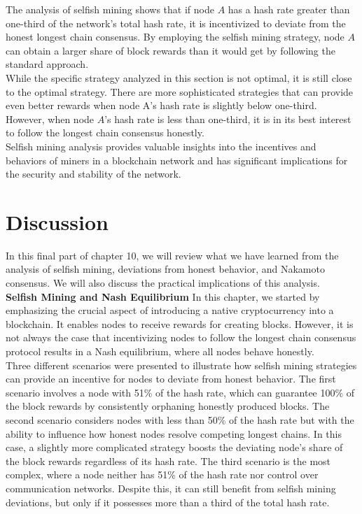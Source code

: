 The analysis of selfish mining shows that if node $A$ has a hash rate greater than one-third of the network's total hash rate, it is incentivized to deviate from the honest longest chain consensus. By employing the selfish mining strategy, node $A$ can obtain a larger share of block rewards than it would get by following the standard approach.\\

While the specific strategy analyzed in this section is not optimal, it is still close to the optimal strategy. There are more sophisticated strategies that can provide even better rewards when node A's hash rate is slightly below one-third. However, when node $A$'s hash rate is less than one-third, it is in its best interest to follow the longest chain consensus honestly.\\

Selfish mining analysis provides valuable insights into the incentives and behaviors of miners in a blockchain network and has significant implications for the security and stability of the network.

\section{Discussion}
In this final part of chapter 10, we will review what we have learned from the analysis of selfish mining, deviations from honest behavior, and Nakamoto consensus. We will also discuss the practical implications of this analysis.\\

\noindent
\textbf{Selfish Mining and Nash Equilibrium}
In this chapter, we started by emphasizing the crucial aspect of introducing a native cryptocurrency into a blockchain. It enables nodes to receive rewards for creating blocks. However, it is not always the case that incentivizing nodes to follow the longest chain consensus protocol results in a Nash equilibrium, where all nodes behave honestly.\\

Three different scenarios were presented to illustrate how selfish mining strategies can provide an incentive for nodes to deviate from honest behavior. The first scenario involves a node with 51\% of the hash rate, which can guarantee 100\% of the block rewards by consistently orphaning honestly produced blocks. The second scenario considers nodes with less than 50\% of the hash rate but with the ability to influence how honest nodes resolve competing longest chains. In this case, a slightly more complicated strategy boosts the deviating node's share of the block rewards regardless of its hash rate. The third scenario is the most complex, where a node neither has 51\% of the hash rate nor control over communication networks. Despite this, it can still benefit from selfish mining deviations, but only if it possesses more than a third of the total hash rate.\\


